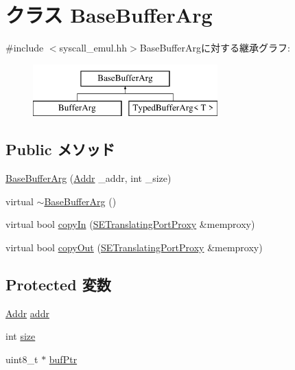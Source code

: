 \hypertarget{classBaseBufferArg}{
\section{クラス BaseBufferArg}
\label{classBaseBufferArg}
}


{\ttfamily \#include $<$syscall\_\-emul.hh$>$}BaseBufferArgに対する継承グラフ:\begin{figure}[H]
\begin{center}
\leavevmode
\includegraphics[height=2cm]{classBaseBufferArg}
\end{center}
\end{figure}
\subsection*{Public メソッド}
\begin{DoxyCompactItemize}
\item 
\hyperlink{classBaseBufferArg_a4c9d2832c9c1eb28f96dcc3cf2e3e5bc}{BaseBufferArg} (\hyperlink{base_2types_8hh_af1bb03d6a4ee096394a6749f0a169232}{Addr} \_\-addr, int \_\-size)
\item 
virtual \hyperlink{classBaseBufferArg_a217d9ef0236c3a53d5b8abc75b40f2b5}{$\sim$BaseBufferArg} ()
\item 
virtual bool \hyperlink{classBaseBufferArg_a857fbf24e9b55ad1f3d566d9c7768b93}{copyIn} (\hyperlink{classSETranslatingPortProxy}{SETranslatingPortProxy} \&memproxy)
\item 
virtual bool \hyperlink{classBaseBufferArg_ac23dfde74cedabe689c1380678b66622}{copyOut} (\hyperlink{classSETranslatingPortProxy}{SETranslatingPortProxy} \&memproxy)
\end{DoxyCompactItemize}
\subsection*{Protected 変数}
\begin{DoxyCompactItemize}
\item 
\hyperlink{base_2types_8hh_af1bb03d6a4ee096394a6749f0a169232}{Addr} \hyperlink{classBaseBufferArg_a0bb77b4ba61e408313e1118250f9278c}{addr}
\item 
int \hyperlink{classBaseBufferArg_a439227feff9d7f55384e8780cfc2eb82}{size}
\item 
uint8\_\-t $\ast$ \hyperlink{classBaseBufferArg_a2c8fa4078c67cc4cdb4c1819c127e42f}{bufPtr}
\end{DoxyCompactItemize}


